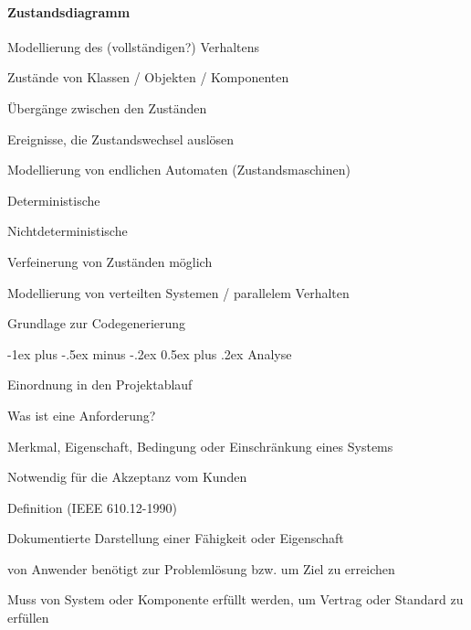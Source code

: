 \documentclass[a4paper]{article}
\makeatletter
\renewcommand{\section}{\@startsection{section}{1}{0mm}%
                                {-1ex plus -.5ex minus -.2ex}%
                                {0.5ex plus .2ex}%
                                {\normalfont\large\bfseries}}
\makeatother
\begin{document}
\begin{multicols}{3}
  \paragraph{Zustandsdiagramm}
  \begin{itemize*}
    \item Modellierung des (vollständigen?) Verhaltens
          \begin{itemize*}
            \item Zustände von Klassen / Objekten / Komponenten
            \item Übergänge zwischen den Zuständen
            \item Ereignisse, die Zustandswechsel auslösen
          \end{itemize*}
    \item Modellierung von endlichen Automaten (Zustandsmaschinen)
          \begin{itemize*}
            \item Deterministische
            \item Nichtdeterministische
          \end{itemize*}
    \item Verfeinerung von Zuständen möglich
    \item Modellierung von verteilten Systemen / parallelem Verhalten
    \item Grundlage zur Codegenerierung
  \end{itemize*}


  \section{Analyse}
  \begin{itemize*}
    \item Einordnung in den Projektablauf
    \item Was ist eine Anforderung?
          \begin{itemize*}
            \item Merkmal, Eigenschaft, Bedingung oder Einschränkung eines Systems
            \item Notwendig für die Akzeptanz vom Kunden
            \item Definition (IEEE 610.12-1990)
                  \begin{itemize*}
                    \item Dokumentierte Darstellung einer Fähigkeit oder Eigenschaft
                    \item von Anwender benötigt zur Problemlösung bzw. um Ziel zu erreichen
                    \item Muss von System oder Komponente erfüllt werden, um Vertrag oder Standard zu erfüllen
                  \end{itemize*}
          \end{itemize*}
  \end{itemize*}


\end{multicols}
\end{document}
